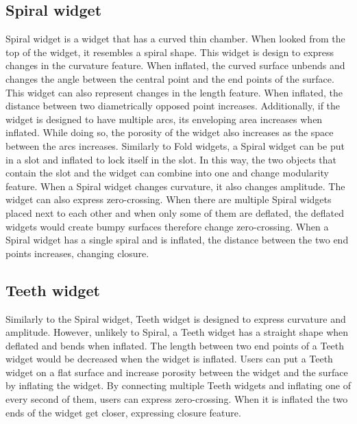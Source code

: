     \subsection{Spiral widget}
      Spiral widget is a widget that has a curved thin chamber. When looked
      from the top of the widget, it resembles a spiral shape. This widget is
      design to express changes in the curvature feature. When inflated, the
      curved surface unbends and changes the angle between the central point
      and the end points of the surface. This widget can also represent
      changes in the length feature. When inflated, the distance between two
      diametrically opposed point increases. Additionally, if the widget is
      designed to have multiple arcs, its enveloping area increases when
      inflated. While doing so, the porosity of the widget also increases as
      the space between the arcs increases.  Similarly to Fold widgets, a
      Spiral widget can be put in a slot and inflated to lock itself in the
      slot. In this way, the two objects that contain the slot and the widget
      can combine into one and change modularity feature.  When a Spiral
      widget changes curvature, it also changes amplitude.  The widget can
      also express zero-crossing. When there are multiple Spiral widgets
      placed next to each other and when only some of them are deflated, the
      deflated widgets would create bumpy surfaces therefore change
      zero-crossing.  When a Spiral widget has a single spiral and is
      inflated, the distance between the two end points increases, changing
      closure.
        
    \subsection{Teeth widget}
      Similarly to the Spiral widget, Teeth widget is designed to express
      curvature and amplitude. However, unlikely to Spiral, a Teeth widget has
      a straight shape when deflated and bends when inflated.  The length
      between two end points of a Teeth widget would be decreased when the
      widget is inflated.  Users can put a Teeth widget on a flat surface and
      increase porosity between the widget and the surface by inflating the
      widget.  By connecting multiple Teeth widgets and inflating one of every
      second of them, users can express zero-crossing.  When it is inflated
      the two ends of the widget get closer, expressing closure feature.
        
